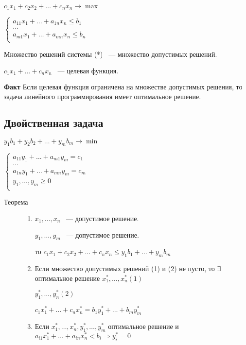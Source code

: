 \documentclass[12pt]{article}
\begin{document}
\begin{description}
$c_1 x_1 + c_2 x_2 + \ldots + c_n x_n \to \max$

$\begin{cases} a_{11}x_1 + \ldots + a_{1n}x_n \le b_1\\ \ldots \\  a_{m1}x_1 + \ldots + a_{mn}x_n \le b_n\\ \end{cases}$

Множество решений системы (*) ~--- множество допустимых решений.

$c_1 x_1 + \ldots + c_n x_n$ ~--- целевая функция.

{\bf Факт} Если целевая функция ограничена на множестве допустимых решения, то задача линейного программирования имеет оптимальное решение. 

\subsection{Двойственная задача}

$y_1 b_1 + y_2 b_2 + \ldots + y_m b_m \to \min$

$\begin{cases} a_{11}y_1 + \ldots + a_{m1}y_m = c_1\\ \ldots \\  a_{1n}y_1 + \ldots + a_{mn}y_m = c_m\\ y_1, \ldots, y_m \ge 0 \\ \end{cases}$

\begin{description}
\item[Теорема]
\begin{enumerate}
\item $x_1, \ldots, x_n$ ~--- допустимое решение.

$y_1, \ldots, y_m$ ~--- допустимое решение.

то $c_1 x_1 + c_2 x_2 + \ldots + c_n x_n \le y_1 b_1 + \ldots + y_m b_m$

\item Если множество допустимых решений (1) и (2) не пусто, то $\exists$ оптимальное решение $x_1^*, \ldots, x_n^*(1)$ 

$y_1^*, \ldots, y_n^* (2)$

$c_1 x_1^* + \ldots + c_n x_n^* = b_1 y_1^* + \ldots + b_m y_m^*$

\item Если $x_1^*, \ldots, x_n^*, y_1^*, \ldots, y_m^*$  оптимальное решение и $a_{i1}x_1^* + \ldots + a_{in}x_n^* < b_i \Rightarrow y_i^* = 0$
\end{enumerate}


\end{description}
\end{description}
\end{document}
